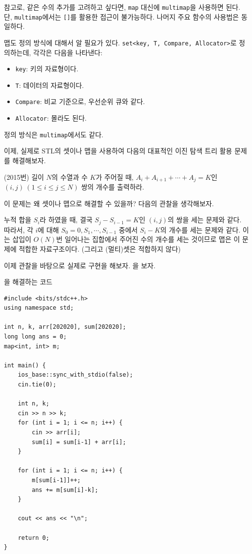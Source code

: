 참고로, 같은 수의 추가를 고려하고 싶다면, \texttt{map} 대신에 \texttt{multimap}을 사용하면 된다. 단, \texttt{multimap}에서는 \texttt{[]}를 활용한 접근이 불가능하다. 나머지 주요 함수의 사용법은 동일하다.

맵도 정의 방식에 대해서 알 필요가 있다. \texttt{set<key, T, Compare, Allocator>}로 정의하는데, 각각은 다음을 나타낸다:

\begin{itemize}
    \item \texttt{key}: 키의 자료형이다.
    \item \texttt{T}: 데이터의 자료형이다.
    \item \texttt{Compare}: 비교 기준으로, 우선순위 큐와 같다.
    \item \texttt{Allocator}: 몰라도 된다.
\end{itemize}

정의 방식은 \texttt{multimap}에서도 같다.

이제, 실제로 STL의 셋이나 맵을 사용하여 다음의 대표적인 이진 탐색 트리 활용 문제를 해결해보자.

\begin{example} \label{ex: set-map}
    (2015번) 길이 $N$의 수열과 수 $K$가 주어질 때, $A_i + A_{i+1} + \cdots + A_j = K$인 $(i, j)~(1 \leq i \leq j \leq N)$ 쌍의 개수를 출력하라.
\end{example}

이 문제는 왜 셋이나 맵으로 해결할 수 있을까? 다음의 관찰을 생각해보자.

\begin{obs}
    누적 합을 $S_i$라 하였을 때, 결국 $S_j - S_{i-1} = K$인 $(i, j)$의 쌍을 세는 문제와 같다. 따라서, 각 $i$에 대해 $S_0 = 0, S_1, \cdots, S_{i-1}$ 중에서 $S_i - K$의 개수를 세는 문제와 같다. 이는 삽입이 $O(N)$번 일어나는 집합에서 주어진 수의 개수를 세는 것이므로 맵은 이 문제에 적합한 자료구조이다. (그리고 (멀티)셋은 적합하지 않다)
\end{obs}

이제 관찰을 바탕으로 실제로 구현을 해보자. 을 보자.

\begin{code} \label{code: array-sum-count}
을 해결하는 코드
\begin{lstlisting}
#include <bits/stdc++.h>
using namespace std;

int n, k, arr[202020], sum[202020];
long long ans = 0;
map<int, int> m;

int main() {
    ios_base::sync_with_stdio(false);
    cin.tie(0);
    
    int n, k;
    cin >> n >> k;
    for (int i = 1; i <= n; i++) {
        cin >> arr[i];
        sum[i] = sum[i-1] + arr[i];
    }
    
    for (int i = 1; i <= n; i++) {
        m[sum[i-1]]++;
        ans += m[sum[i]-k];
    }
    
    cout << ans << "\n";
    
    return 0;
}
\end{lstlisting}
\end{code}

